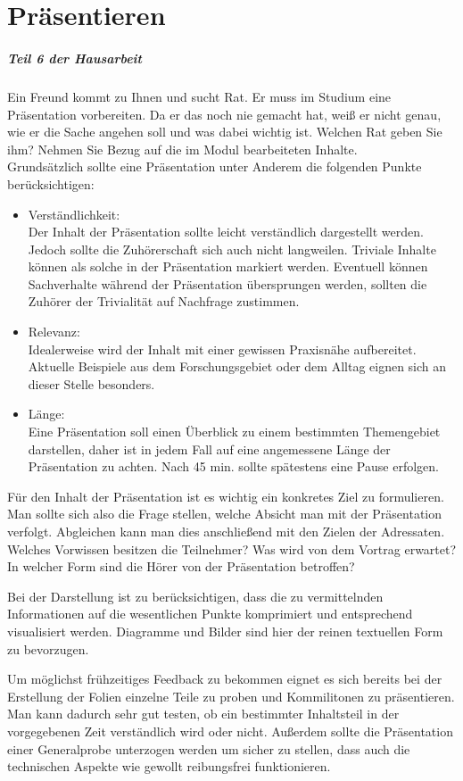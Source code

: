 %
\chapter{Präsentieren}
\label{sec:praesentieren}

\paragraph{Teil 6 der Hausarbeit}
Ein Freund kommt zu Ihnen und sucht Rat. Er muss im Studium eine Präsentation vorbereiten. Da er das noch nie gemacht hat, weiß er nicht genau, wie er die Sache angehen soll und was dabei wichtig ist. Welchen Rat geben Sie ihm? Nehmen Sie Bezug auf die im Modul bearbeiteten Inhalte. \\[0.4em]

Grundsätzlich sollte eine Präsentation unter Anderem die folgenden Punkte berücksichtigen:

\begin{itemize}
    \item Verständlichkeit: \\ Der Inhalt der Präsentation sollte leicht verständlich dargestellt werden. Jedoch sollte die Zuhörerschaft sich auch nicht langweilen. Triviale Inhalte können als solche in der Präsentation markiert werden. Eventuell können Sachverhalte während der Präsentation  übersprungen werden, sollten die Zuhörer der Trivialität auf Nachfrage zustimmen.
    \item Relevanz: \\ Idealerweise wird der Inhalt mit einer gewissen Praxisnähe aufbereitet. Aktuelle Beispiele aus dem Forschungsgebiet oder dem Alltag eignen sich an dieser Stelle besonders.
    \item Länge: \\ Eine Präsentation soll einen Überblick zu einem bestimmten Themengebiet darstellen, daher ist in jedem Fall auf eine angemessene Länge der Präsentation zu achten. Nach 45 min. sollte spätestens eine Pause erfolgen.
\end{itemize}

Für den Inhalt der Präsentation ist es wichtig ein konkretes Ziel zu formulieren. Man sollte sich also die Frage stellen, welche Absicht man mit der Präsentation verfolgt. Abgleichen kann man dies anschließend mit den Zielen der Adressaten. Welches Vorwissen besitzen die Teilnehmer? Was wird von dem Vortrag erwartet? In welcher Form sind die Hörer von der Präsentation betroffen?

Bei der Darstellung ist zu berücksichtigen, dass die zu vermittelnden Informationen auf die wesentlichen Punkte komprimiert und entsprechend visualisiert werden. Diagramme und Bilder sind hier der reinen textuellen Form zu bevorzugen.

Um möglichst frühzeitiges Feedback zu bekommen eignet es sich bereits bei der Erstellung der Folien einzelne Teile zu proben und Kommilitonen zu präsentieren. Man kann dadurch sehr gut testen, ob ein bestimmter Inhaltsteil in der vorgegebenen Zeit verständlich wird oder nicht.
Außerdem sollte die Präsentation einer Generalprobe unterzogen werden um sicher zu stellen, dass auch die technischen Aspekte wie gewollt reibungsfrei funktionieren.
